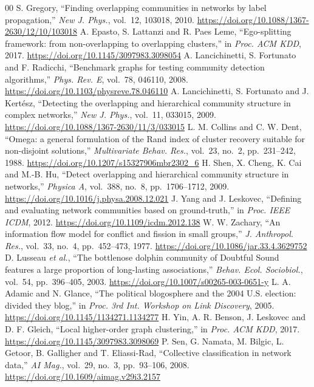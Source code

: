 \documentclass[conference]{IEEEtran}
\begin{document}
\begin{thebibliography}{00}
 S. Gregory, ``Finding overlapping communities in networks by label propagation,'' \emph{New J. Phys.}, vol.~12, 103018, 2010. \url{https://doi.org/10.1088/1367-2630/12/10/103018}
 A. Epasto, S. Lattanzi and R. Paes Leme, ``Ego-splitting framework: from non-overlapping to overlapping clusters,'' in \emph{Proc. ACM KDD}, 2017. \url{https://doi.org/10.1145/3097983.3098054}
 A. Lancichinetti, S. Fortunato and F. Radicchi, ``Benchmark graphs for testing community detection algorithms,'' \emph{Phys. Rev. E}, vol.~78, 046110, 2008. \url{https://doi.org/10.1103/physreve.78.046110}
 A. Lancichinetti, S. Fortunato and J. Kert\'esz, ``Detecting the overlapping and hierarchical community structure in complex networks,'' \emph{New J. Phys.}, vol.~11, 033015, 2009. \url{https://doi.org/10.1088/1367-2630/11/3/033015}
 L. M. Collins and C. W. Dent, ``Omega: a general formulation of the Rand index of cluster recovery suitable for non-disjoint solutions,'' \emph{Multivariate Behav. Res.}, vol.~23, no.~2, pp.~231--242, 1988. \url{https://doi.org/10.1207/s15327906mbr2302_6}
 H. Shen, X. Cheng, K. Cai and M.-B. Hu, ``Detect overlapping and hierarchical community structure in networks,'' \emph{Physica A}, vol.~388, no.~8, pp.~1706--1712, 2009. \url{https://doi.org/10.1016/j.physa.2008.12.021}
 J. Yang and J. Leskovec, ``Defining and evaluating network communities based on ground-truth,'' in \emph{Proc. IEEE ICDM}, 2012. \url{https://doi.org/10.1109/icdm.2012.138}
 W. W. Zachary, ``An information flow model for conflict and fission in small groups,'' \emph{J. Anthropol. Res.}, vol.~33, no.~4, pp.~452--473, 1977. \url{https://doi.org/10.1086/jar.33.4.3629752}
 D. Lusseau \emph{et al.}, ``The bottlenose dolphin community of Doubtful Sound features a large proportion of long-lasting associations,'' \emph{Behav. Ecol. Sociobiol.}, vol.~54, pp.~396--405, 2003. \url{https://doi.org/10.1007/s00265-003-0651-y}
 L. A. Adamic and N. Glance, ``The political blogosphere and the 2004 U.S. election: divided they blog,'' in \emph{Proc. 3rd Int. Workshop on Link Discovery}, 2005. \url{https://doi.org/10.1145/1134271.1134277}
 H. Yin, A. R. Benson, J. Leskovec and D. F. Gleich, ``Local higher-order graph clustering,'' in \emph{Proc. ACM KDD}, 2017. \url{https://doi.org/10.1145/3097983.3098069}
 P. Sen, G. Namata, M. Bilgic, L. Getoor, B. Galligher and T. Eliassi-Rad, ``Collective classification in network data,'' \emph{AI Mag.}, vol.~29, no.~3, pp.~93--106, 2008. \url{https://doi.org/10.1609/aimag.v29i3.2157}
\end{thebibliography}
\end{document}
